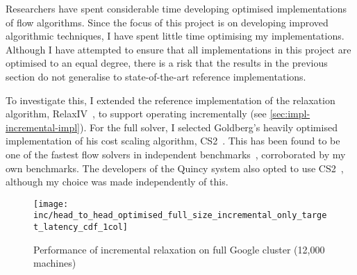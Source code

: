 Researchers have spent considerable time developing optimised implementations of flow algorithms. Since the focus of this project is on developing improved algorithmic techniques, I have spent little time optimising my implementations. Although I have attempted to ensure that all implementations in this project are optimised to an equal degree, there is a risk that the results in the previous section do not generalise to state-of-the-art reference implementations. 

To investigate this, I extended the reference implementation of the relaxation algorithm, RelaxIV~\cite{RelaxIV:2011}, to support operating incrementally (see \cref{sec:impl-incremental-impl}). For the full solver, I selected Goldberg's heavily optimised implementation of his cost scaling algorithm, CS2~\cite{CS2:2009}. This has been found to be one of the fastest flow solvers in independent benchmarks~\cite{KiralyKovacs:2012}, corroborated by my own benchmarks. The developers of the Quincy system also opted to use CS2~\cite{Isard:2009}, although my choice was made independently of this.

%

\begin{figure}
    \texttt{[image: inc/head\_to\_head\_optimised\_full\_size\_incremental\_only\_target\_latency\_cdf\_1col]}
    \caption{Performance of incremental relaxation on full Google cluster (12,000 machines)}
    \label{fig:inc-head-to-head-optimised-inconly}
\end{figure}

